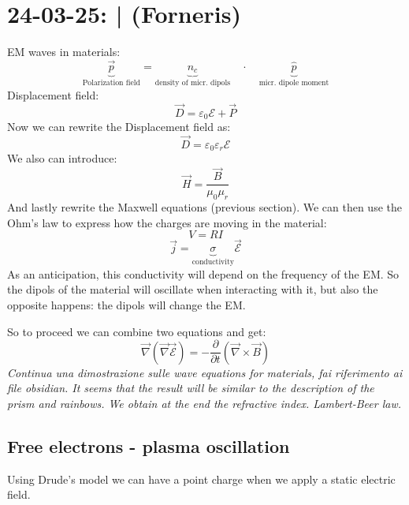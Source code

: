 \section{24-03-25: |  (Forneris)}

EM waves in materials:
\begin{equation}
    \underbrace{\vec{p}}_{\text{Polarization field}} = \underbrace{n_c}_{\text{density of micr. dipols}} \quad\cdot\quad \underbrace{\hat{p}}_{\text{micr. dipole moment}}
\end{equation}
Displacement field:
\begin{equation}
    \vec{D} = \varepsilon_0 \mathcal{E} + \vec{P}
\end{equation}
Now we can rewrite the Displacement field as:
\begin{equation}
    \vec{D} = \varepsilon_0 \varepsilon_r \mathcal{E}
\end{equation}
We also can introduce:
\begin{equation}
    \vec{H} = \frac{\vec{B}}{\mu_0\mu_r}
\end{equation}
And lastly rewrite the Maxwell equations (previous section).
We can then use the Ohm's law to express how the charges are moving in the material:
\begin{equation}
    V = RI
\end{equation}
\begin{equation}
    \vec{j} = \underbrace{\sigma}_{\text{conductivity}} \vec{\mathcal{E}}
\end{equation}
As an anticipation, this conductivity will depend on the frequency of the EM. So the dipols of the material will oscillate when interacting with it, but also the opposite happens: the dipols will change the EM.

So to proceed we can combine two equations and get:
\begin{equation}
    \vec{\nabla} \left( \vec{\nabla} \vec{\mathcal{E}}\right) = - \frac{\partial}{\partial t} \left(\vec{\nabla} \times \vec{B}\right)
\end{equation}
\textit{Continua una dimostrazione sulle wave equations for materials, fai riferimento ai file obsidian. It seems that the result will be similar to the description of the prism and rainbows. We obtain at the end the refractive index. Lambert-Beer law.}

\subsection{Free electrons - plasma oscillation}
Using Drude's model we can have a point charge when we apply a static electric field.   
